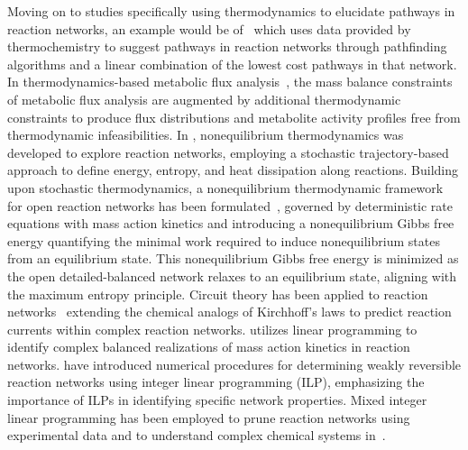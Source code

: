 Moving on to studies specifically using thermodynamics to elucidate pathways in reaction networks, an example would be of~\cite{synthesis_planning_CRN_thermodynamics} which uses data provided by thermochemistry to suggest pathways in reaction networks through pathfinding algorithms and a linear combination of the lowest cost pathways in that network. 
In thermodynamics-based metabolic flux analysis~\cite{hatz_thermo_flow}, the mass balance constraints of metabolic flux analysis are augmented by additional thermodynamic constraints to produce flux distributions and metabolite activity profiles free from thermodynamic infeasibilities.
In \cite{seifert_thermodynamics_CRN_JCP}, nonequilibrium thermodynamics was developed to explore reaction networks, employing a stochastic trajectory-based approach to define energy, entropy, and heat dissipation along reactions.
Building upon stochastic thermodynamics, a nonequilibrium thermodynamic framework for open reaction networks has been formulated~\cite{esposito_thermodynamics_CRN_PRX}, governed by deterministic rate equations with mass action kinetics and introducing a nonequilibrium Gibbs free energy quantifying the minimal work required to induce nonequilibrium states from an equilibrium state.
This nonequilibrium Gibbs free energy is minimized as the open detailed-balanced network relaxes to an equilibrium state, aligning with the maximum entropy principle.
Circuit theory has been applied to reaction networks~\cite{esposito_circuit_theory_CRN_PRX} extending the chemical analogs of Kirchhoff’s laws to predict reaction currents within complex reaction networks.
\cite{ILP_paper2} utilizes linear programming to identify complex balanced realizations of mass action kinetics in reaction networks.
\cite{ILP_paper2, ILP_paper3, ILP_paper4} have introduced numerical procedures for determining weakly reversible reaction networks using integer linear programming (ILP), emphasizing the importance of ILPs in identifying specific network properties.
Mixed integer linear programming has been employed to prune reaction networks using experimental data and to understand complex chemical systems in~\cite{ilp_CRN_infer}.

